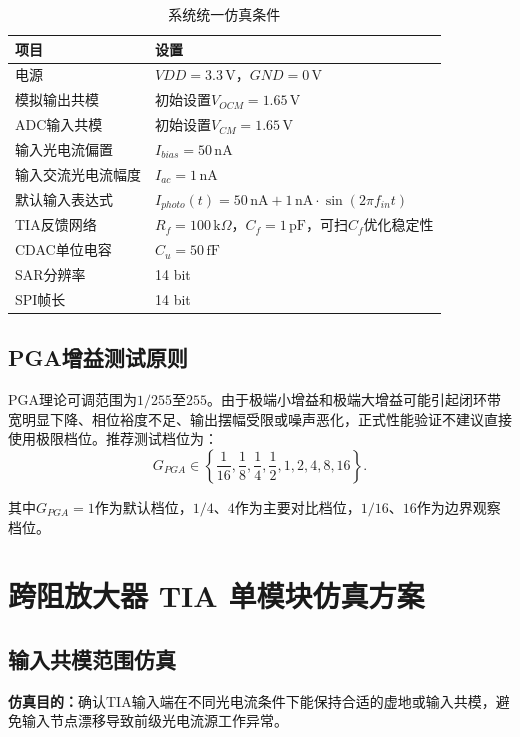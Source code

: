 \documentclass[12pt,a4paper]{ctexart}
\begin{document}
\begin{table}[H]
\centering
\caption{系统统一仿真条件}
\begin{tabular}{ll}
\toprule
项目 & 设置 \\
\midrule
电源 & $VDD=3.3\,\mathrm{V}$，$GND=0\,\mathrm{V}$ \\
模拟输出共模 & 初始设置$V_{OCM}=1.65\,\mathrm{V}$ \\
ADC输入共模 & 初始设置$V_{CM}=1.65\,\mathrm{V}$ \\
输入光电流偏置 & $I_{bias}=50\,\mathrm{nA}$ \\
输入交流光电流幅度 & $I_{ac}=1\,\mathrm{nA}$ \\
默认输入表达式 & $I_{photo}(t)=50\,\mathrm{nA}+1\,\mathrm{nA}\cdot\sin(2\pi f_{in}t)$ \\
TIA反馈网络 & $R_f=100\,\mathrm{k}\Omega$，$C_f=1\,\mathrm{pF}$，可扫$C_f$优化稳定性 \\
CDAC单位电容 & $C_u=50\,\mathrm{fF}$ \\
SAR分辨率 & 14 bit \\
SPI帧长 & 14 bit \\
\bottomrule
\end{tabular}
\end{table}

\subsection{PGA增益测试原则}

PGA理论可调范围为$1/255$至$255$。由于极端小增益和极端大增益可能引起闭环带宽明显下降、相位裕度不足、输出摆幅受限或噪声恶化，正式性能验证不建议直接使用极限档位。推荐测试档位为：
\begin{equation}
G_{PGA}\in\left\{\frac{1}{16},\frac{1}{8},\frac{1}{4},\frac{1}{2},1,2,4,8,16\right\}.
\end{equation}

其中$G_{PGA}=1$作为默认档位，$1/4$、$4$作为主要对比档位，$1/16$、$16$作为边界观察档位。

\section{跨阻放大器 TIA 单模块仿真方案}

\subsection{输入共模范围仿真}

\textbf{仿真目的：}确认TIA输入端在不同光电流条件下能保持合适的虚地或输入共模，避免输入节点漂移导致前级光电流源工作异常。
\end{document}
